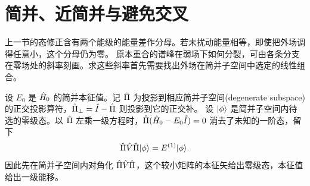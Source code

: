\section{简并、近简并与避免交叉}
上一节的态修正含有两个能级的能量差作分母。若未扰动能量相等，即使把外场调得任意小，这个分母仍为零。
原本重合的谱峰在弱场下如何分裂，可由各条分支在零场处的斜率刻画。求这些斜率首先需要找出外场在简并子空间中选定的线性组合。

设 $E_0$ 是 $\hat{H}_0$ 的简并本征值。记 $\hat{\Pi}$ 为投影到相应简并子空间(degenerate subspace)的正交投影算符，$\hat{\Pi}_\perp = \hat{I} - \hat{\Pi}$ 则投影到它的正交补。
设 $\lvert\phi\rangle$ 是简并子空间内待选的零级态。以 $\hat{\Pi}$ 左乘一级方程时，$\hat{\Pi}(\hat{H}_0 - E_0\hat{I}) = 0$ 消去了未知的一阶态，留下
\begin{equation}
    \hat{\Pi}\hat{V}\hat{\Pi}\lvert\phi\rangle = E^{(1)}\lvert\phi\rangle.
\end{equation}
因此先在简并子空间内对角化 $\hat{\Pi}\hat{V}\hat{\Pi}$，这个较小矩阵的本征矢给出零级态，本征值给出一级能移。


